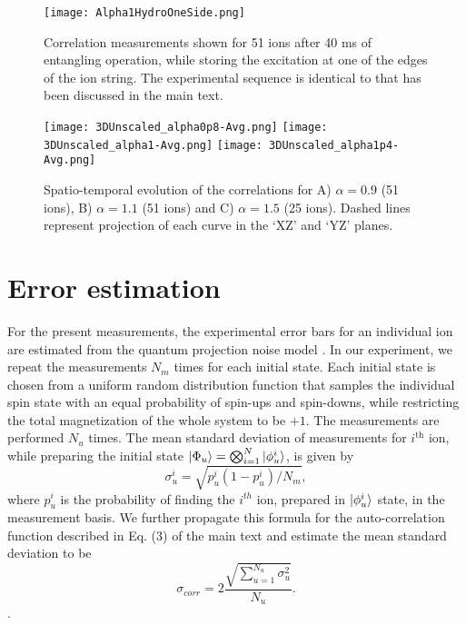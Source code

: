 \documentclass[aps,10pt,reprint,groupedaddress,superscriptaddress]{revtex4-2}
\begin{document}
\begin{figure}
\centering
\texttt{[image: Alpha1HydroOneSide.png]}
\caption{Correlation measurements shown for 51 ions after 40 ms of entangling operation, while storing the excitation at one of the edges of the ion string. The experimental sequence is identical to that has been discussed in the main text. } \label{fig:HydroAtIon1}
\end{figure}
\begin{figure*}
\centering
\texttt{[image: 3DUnscaled\_alpha0p8-Avg.png]}
\texttt{[image: 3DUnscaled\_alpha1-Avg.png]}
\texttt{[image: 3DUnscaled\_alpha1p4-Avg.png]}
\caption{Spatio-temporal evolution of the correlations for A)  $\alpha=0.9$ (51 ions), B) $\alpha=1.1$ (51 ions) and C)  $\alpha=1.5$ (25 ions). Dashed lines represent projection of each curve in the `XZ' and `YZ' planes. }  \label{fig:UnScSpatioTempo}
\end{figure*}

\section{Error estimation}
For the present measurements, the experimental error bars for an individual ion are estimated from the quantum projection noise model \cite{Itano1993}. In our experiment, we repeat the measurements $N_m$ times for each initial state. Each initial state is chosen from a uniform random distribution function that samples the individual spin state with an equal probability of spin-ups and spin-downs, while restricting the total magnetization of the whole system to be $+1$. The measurements are performed $N_u$ times. The mean standard deviation of  measurements for $i^\text{th}$ ion, while preparing the initial state $\ket{\Phi_u}= \bigotimes_{i = 1}^{N} \ket{\phi_u^i}$, is given by
\begin{equation}
    \sigma_u^{i}=\sqrt{p_u^{i}(1-p_u^{i})/N_m},
\end{equation}
where $p_u^{i}$ is the probability of finding the $i^{th}$ ion, prepared in $\ket{\phi_u^i}$  state, in the measurement basis. We further propagate this formula for the auto-correlation function described in Eq. (3) of the main text and estimate the mean standard deviation to be
\begin{equation}
    \sigma_{corr}=2\frac{\sqrt{\sum_{u=1}^{N_u} \sigma_u^2}}{N_u}.
\end{equation}.
\end{document}
